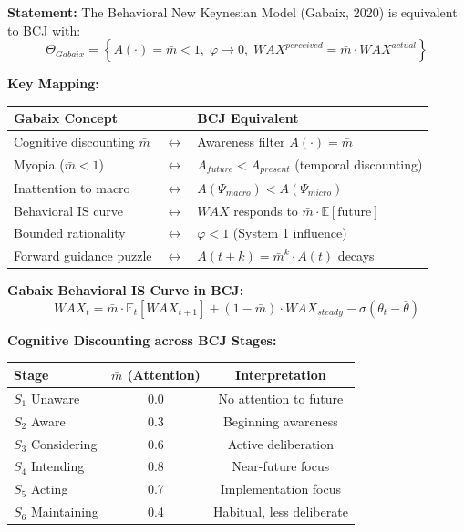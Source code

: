 \begin{tcolorbox}[colback=green!5!white, colframe=green!75!black,
    title=Theorem BCJ-T23: Gabaix Behavioral Macro as Special Case]
\textbf{Statement:} The Behavioral New Keynesian Model (Gabaix, 2020) is equivalent to BCJ with:
\begin{equation}
\Theta_{Gabaix} = \left\{A(\cdot) = \bar{m} < 1, \; \varphi \to 0, \; WAX^{perceived} = \bar{m} \cdot WAX^{actual}\right\}
\end{equation}

\textbf{Key Mapping:}
\begin{center}
\begin{tabular}{lcl}
\toprule
\textbf{Gabaix Concept} & & \textbf{BCJ Equivalent} \\
\midrule
Cognitive discounting $\bar{m}$ & $\leftrightarrow$ & Awareness filter $A(\cdot) = \bar{m}$ \\
Myopia ($\bar{m} < 1$) & $\leftrightarrow$ & $A_{future} < A_{present}$ (temporal discounting) \\
Inattention to macro & $\leftrightarrow$ & $A(\Psi_{macro}) < A(\Psi_{micro})$ \\
Behavioral IS curve & $\leftrightarrow$ & $WAX$ responds to $\bar{m} \cdot \mathbb{E}[\text{future}]$ \\
Bounded rationality & $\leftrightarrow$ & $\varphi < 1$ (System 1 influence) \\
Forward guidance puzzle & $\leftrightarrow$ & $A(t+k) = \bar{m}^k \cdot A(t)$ decays \\
\bottomrule
\end{tabular}
\end{center}

\textbf{Gabaix Behavioral IS Curve in BCJ:}
\begin{equation}
WAX_t = \bar{m} \cdot \mathbb{E}_t[WAX_{t+1}] + (1-\bar{m}) \cdot WAX_{steady} - \sigma(\theta_t - \bar{\theta})
\end{equation}

\textbf{Cognitive Discounting across BCJ Stages:}
\begin{center}
\begin{tabular}{lcc}
\toprule
\textbf{Stage} & \textbf{$\bar{m}$ (Attention)} & \textbf{Interpretation} \\
\midrule
$S_1$ Unaware & 0.0 & No attention to future \\
$S_2$ Aware & 0.3 & Beginning awareness \\
$S_3$ Considering & 0.6 & Active deliberation \\
$S_4$ Intending & 0.8 & Near-future focus \\
$S_5$ Acting & 0.7 & Implementation focus \\
$S_6$ Maintaining & 0.4 & Habitual, less deliberate \\
\bottomrule
\end{tabular}
\end{center}


\end{tcolorbox}

